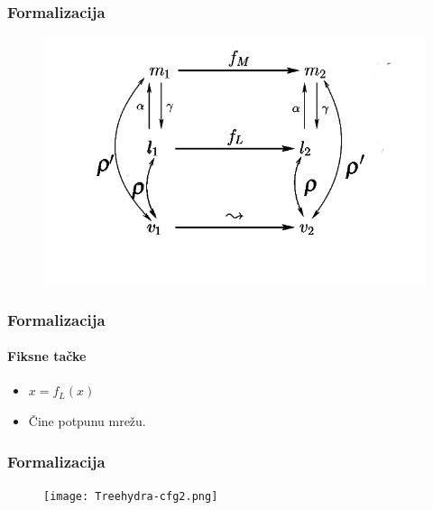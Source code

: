 \documentclass[xetex,mathserif,serif]{beamer}
\begin{document}
  \begin{frame}
    \frametitle{Formalizacija}
    \begin{figure}
		\begin{center}
		\includegraphics[scale=0.5]{Rho_prime.png}
		\end{center}
	\end{figure}
  \end{frame}
  \begin{frame}
    \frametitle{Formalizacija}
    \framesubtitle{Fiksne tačke}
	\begin{center}
		\begin{itemize}
			\item $x = f_{L}(x)$
			\item Čine potpunu mrežu.
		\end{itemize}
		\end{center}
  \end{frame}
  \begin{frame}
    \frametitle{Formalizacija}
    \begin{figure}
		\begin{center}
		\texttt{[image: Treehydra-cfg2.png]}
		\end{center}
	\end{figure}
  \end{frame}
  
\end{document}
